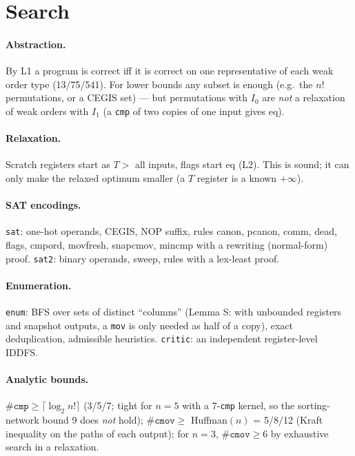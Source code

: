 \documentclass[11pt]{article}
\theoremstyle{remark}\newtheorem{remark}[theorem]{Remark}
\begin{document}
\section{Search}\label{sec:search}
\paragraph{Abstraction.} By L1 a program is correct iff it is correct on one representative of each weak order type
(13/75/541). For lower bounds any subset is enough (e.g.\ the $n!$ permutations, or a CEGIS set) --- but permutations with
$I_0$ are \emph{not} a relaxation of weak orders with $I_1$ (a \texttt{cmp} of two copies of one input gives eq).
\paragraph{Relaxation.} Scratch registers start as $T > $ all inputs, flags start eq (L2). This is sound; it can only make
the relaxed optimum smaller (a $T$ register is a known $+\infty$).
\paragraph{SAT encodings.} \texttt{sat}: one-hot operands, CEGIS, NOP suffix, rules canon, pcanon, comm, dead, flags, cmpord, movfresh,
snapcmov, mincmp with a rewriting (normal-form) proof. \texttt{sat2}: binary operands, sweep, rules with a lex-least proof.
\paragraph{Enumeration.} \texttt{enum}: BFS over sets of distinct ``columns'' (Lemma S: with unbounded registers and snapshot
outputs, a \texttt{mov} is only needed as half of a copy), exact deduplication, admissible heuristics. \texttt{critic}: an
independent register-level IDDFS.
\paragraph{Analytic bounds.} $\#\texttt{cmp} \ge \lceil\log_2 n!\rceil$ (3/5/7; tight for $n=5$ with a 7-\texttt{cmp} kernel,
so the sorting-network bound 9 does \emph{not} hold); $\#\texttt{cmov} \ge$ Huffman$(n)$ = 5/8/12 (Kraft inequality on the
paths of each output); for $n=3$, $\#\texttt{cmov} \ge 6$ by exhaustive search in a relaxation.
\end{document}
